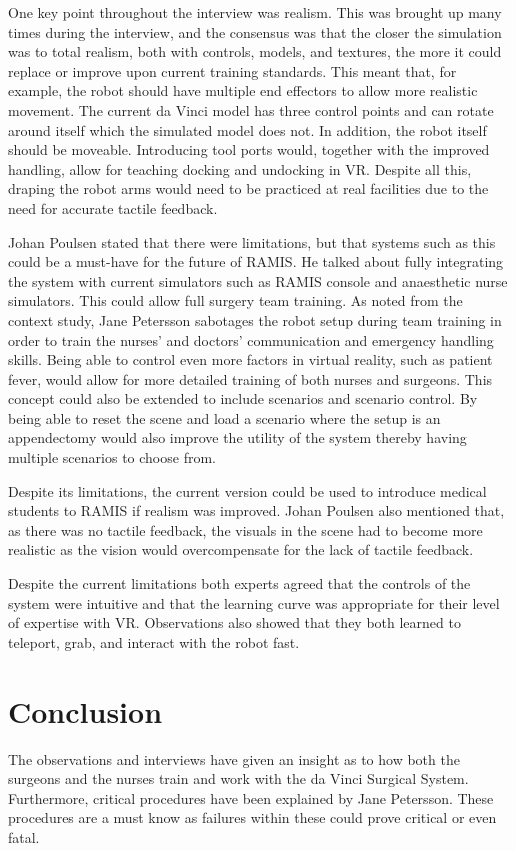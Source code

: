 \documentclass[paper=a4, fontsize=11pt]{scrartcl} %
\numberwithin{equation}{section} %
\numberwithin{figure}{section} %
\numberwithin{table}{section} %
\begin{document}
One key point throughout the interview was realism. This was brought up many times during the interview, and the consensus was that the closer the simulation was to total realism, both with controls, models, and textures, the more it could replace or improve upon current training standards. This meant that, for example, the robot should have multiple end effectors to allow more realistic movement. The current da Vinci model has three control points and can rotate around itself which the simulated model does not. In addition, the robot itself should be moveable. Introducing tool ports would, together with the improved handling, allow for teaching docking and undocking in VR. Despite all this, draping the robot arms would need to be practiced at real facilities due to the need for accurate tactile feedback.

Johan Poulsen stated that there were limitations, but that systems such as this could be a must-have for the future of RAMIS. He talked about fully integrating the system with current simulators such as RAMIS console and anaesthetic nurse simulators. This could allow full surgery team training. As noted from the context study, Jane Petersson sabotages the robot setup during team training in order to train the nurses’ and doctors’ communication and emergency handling skills. Being able to control even more factors in virtual reality, such as patient fever, would allow for more detailed training of both nurses and surgeons. This concept could also be extended to include scenarios and scenario control. By being able to reset the scene and load a scenario where the setup is an appendectomy would also improve the utility of the system thereby having multiple scenarios to choose from.

Despite its limitations, the current version could be used to introduce medical students to RAMIS if realism was improved. Johan Poulsen also mentioned that, as there was no tactile feedback, the visuals in the scene had to become more realistic as the vision would overcompensate for the lack of tactile feedback. 

Despite the current limitations both experts agreed that the controls of the system were intuitive and that the learning curve was appropriate for their level of expertise with VR. Observations also showed that they both learned to teleport, grab, and interact with the robot fast.


\section{Conclusion}
The observations and interviews have given an insight as to how both the surgeons and the nurses train and work with the da Vinci Surgical System. Furthermore, critical procedures have been explained by Jane Petersson. These procedures are a must know as failures within these could prove critical or even fatal.\\
\end{document}
